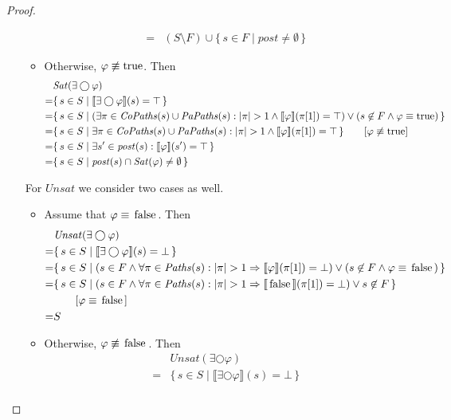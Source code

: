 \documentclass[12pt]{article}
\newcommand{\nxt}{\bigcirc}
\newcommand{\TRUE}{\mbox{\lstinline{true}}}
\newcommand{\FALSE}{\mbox{\lstinline{false}}}
\theoremstyle{definition}
\newcommand{\comment}[1]{\hspace{2em}[\mbox{#1}]}
\newcommand{\satisfaction}[1]{\llbracket #1 \rrbracket}
\newcommand{\bottom}{\mathord{\perp}}
\newenvironment{franck}{\color{red}}{\color{black}}
\begin{document}
\begin{proof}
\begin{itemize}
\begin{franck}
\begin{itemize}
\begin{align*}
= & (S \setminus F) \cup \{\, s \in F \mid \mathit{post} \not= \emptyset \,\}
\end{align*}
\item
Otherwise, $\varphi \not\equiv \TRUE$.  Then
\begin{align*}
& \mathit{Sat}(\exists \nxt \varphi)\\
= & \{\, s \in S \mid \satisfaction{\exists \nxt \varphi}(s) = \top \,\}\\
= & \{\, s \in S \mid (\exists \pi \in \mathit{CoPaths}(s) \cup \mathit{PaPaths}(s) : |\pi| > 1 \wedge \satisfaction{\varphi}(\pi[1]) = \top) \vee (s \not\in F \wedge \varphi \equiv \TRUE) \,\}\\
= & \{\, s \in S \mid \exists \pi \in \mathit{CoPaths}(s) \cup \mathit{PaPaths}(s) : |\pi| > 1 \wedge \satisfaction{\varphi}(\pi[1]) = \top \,\}
\comment{$\varphi \not\equiv \TRUE$}\\
= & \{\, s \in S \mid \exists s' \in \mathit{post}(s) :  \satisfaction{\varphi}(s') = \top \,\}\\
= & \{\, s \in S \mid \mathit{post}(s) \cap \mathit{Sat}(\varphi) \not= \emptyset \,\}
\end{align*}
\end{itemize}
For $\mathit{Unsat}$ we consider two cases as well.
\begin{itemize}
\item 
Assume that $\varphi \equiv \FALSE$.  Then
\begin{align*}
& \mathit{Unsat}(\exists \nxt \varphi)\\
= & \{\, s \in S \mid \satisfaction{\exists \nxt \varphi}(s) = \bottom \,\}\\
= & \{\, s \in S \mid (s \in F \wedge \forall \pi \in \mathit{Paths}(s) : |\pi| > 1 \Rightarrow \satisfaction{\varphi}(\pi[1]) = \bottom) \vee (s \not\in F \wedge \varphi \equiv \FALSE) \,\}\\
= & \{\, s \in S \mid (s \in F \wedge \forall \pi \in \mathit{Paths}(s) : |\pi| > 1 \Rightarrow \satisfaction{\FALSE}(\pi[1]) = \bottom) \vee s \not\in F \,\}\\
& \comment{$\varphi \equiv \FALSE$}\\
= & S
\end{align*}
\item
Otherwise, $\varphi \not\equiv \FALSE$.  Then
\begin{align*}
& \mathit{Unsat}(\exists \nxt \varphi)\\
= & \{\, s \in S \mid \satisfaction{\exists \nxt \varphi}(s) = \bottom \,\}\\

\end{align*}
\end{itemize}
\end{franck}
\end{itemize}
\end{proof}
\end{document}
